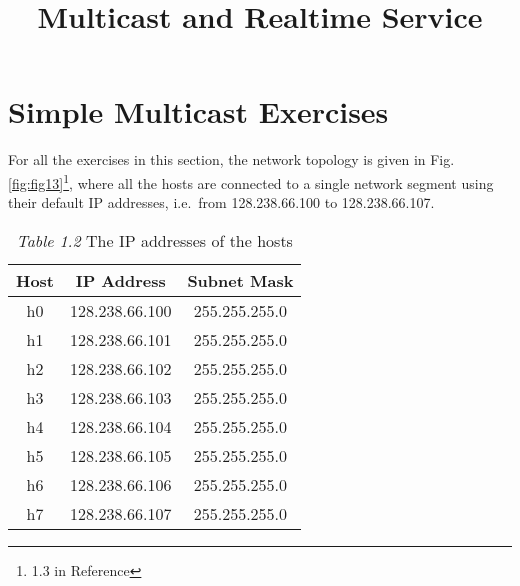 \documentclass{../UTNetLab}
\title{Multicast and Realtime Service}
\begin{document}
\part{Simple Multicast Exercises}
    For all the exercises in this section, the network topology is given in Fig.
    \ref{fig:fig13}\footnote{1.3 in Reference}, where all the hosts are connected to a single network segment using their default IP addresses, i.e.\ from 128.238.66.100 to 128.238.66.107.
    
    \begin{minipage}{0.48\textwidth}
        \begin{flushleft}
            \begin{table}[H]
                \caption{\textit{Table 1.2} The IP addresses of the hosts}
                \label{tbl:1.2}
                \centering
                \begin{tabular}{ c c c }
                    \hline \hline
                    Host & IP Address & Subnet Mask \\
                    \hline 
                    h0 & 128.238.66.100 & 255.255.255.0 \\
                    h1 & 128.238.66.101 & 255.255.255.0 \\
                    h2 & 128.238.66.102 & 255.255.255.0 \\
                    h3 & 128.238.66.103 & 255.255.255.0 \\
                    h4 & 128.238.66.104 & 255.255.255.0 \\
                    h5 & 128.238.66.105 & 255.255.255.0 \\
                    h6 & 128.238.66.106 & 255.255.255.0 \\
                    h7 & 128.238.66.107 & 255.255.255.0 \\
                    \hline \hline
                    \end{tabular}
            \end{table}
        \end{flushleft}
    \end{minipage}
\end{document}
